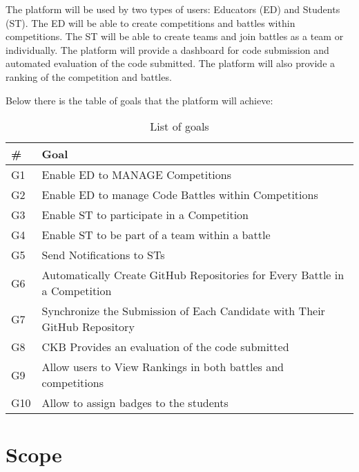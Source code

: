 The platform will be used by two types of users: Educators (ED) and Students (ST). The ED will be able to create competitions and battles within competitions. The ST will be able to create teams and join battles as a team or individually. The platform will provide a dashboard for code submission and automated evaluation of the code submitted. The platform will also provide a ranking of the competition and battles.

Below there is the table of goals that the platform will achieve:
\begin{table}[H]
  \begin{tabular}{|l|l|}










    \hline
    \textbf{\#} & \textbf{Goal}      \\
    \hline
    G1 & Enable ED to MANAGE Competitions \\
    \hline
    G2 & Enable ED to manage Code Battles within Competitions \\
    \hline
    G3 & Enable ST to participate in a Competition \\
    \hline
    G4 & Enable ST to be part of a team within a battle \\
    \hline
    G5 & Send Notifications to STs   \\
    \hline
    G6 & Automatically Create GitHub Repositories for Every Battle in a Competition    \\
    \hline
    G7 & Synchronize the Submission of Each Candidate with Their GitHub Repository   \\
    \hline
    G8 & CKB Provides an evaluation of the code submitted    \\
    \hline
    G9 & Allow users to View Rankings in both battles and competitions   \\
    \hline
    G10 & Allow to assign badges to the students    \\

    \hline

  \end{tabular}
  \caption{List of goals}
  \label{tab:goals}
\end{table}

\section{Scope}
\label{s:Scope}%

